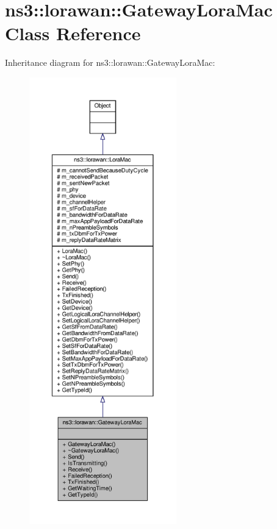 \hypertarget{classns3_1_1lorawan_1_1GatewayLoraMac}{}\section{ns3\+:\+:lorawan\+:\+:Gateway\+Lora\+Mac Class Reference}
\label{classns3_1_1lorawan_1_1GatewayLoraMac}


Inheritance diagram for ns3\+:\+:lorawan\+:\+:Gateway\+Lora\+Mac\+:
\nopagebreak
\begin{figure}[H]
\begin{center}
\leavevmode
\includegraphics[height=550pt]{classns3_1_1lorawan_1_1GatewayLoraMac__inherit__graph}
\end{center}
\end{figure}



